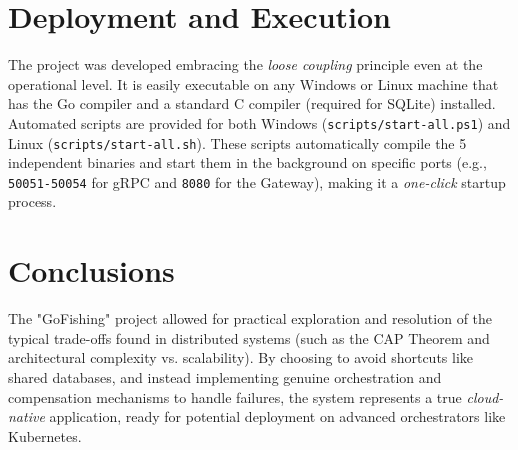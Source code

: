 \documentclass[12pt,a4paper]{article}
\begin{document}
\section{Deployment and Execution}
The project was developed embracing the \textit{loose coupling} principle even at the operational level. It is easily executable on any Windows or Linux machine that has the Go compiler and a standard C compiler (required for SQLite) installed.
Automated scripts are provided for both Windows (\texttt{scripts/start-all.ps1}) and Linux (\texttt{scripts/start-all.sh}).
These scripts automatically compile the 5 independent binaries and start them in the background on specific ports (e.g., \texttt{50051-50054} for gRPC and \texttt{8080} for the Gateway), making it a \textit{one-click} startup process.

\section{Conclusions}
The "GoFishing" project allowed for practical exploration and resolution of the typical trade-offs found in distributed systems (such as the CAP Theorem and architectural complexity vs. scalability).
By choosing to avoid shortcuts like shared databases, and instead implementing genuine orchestration and compensation mechanisms to handle failures, the system represents a true \textit{cloud-native} application, ready for potential deployment on advanced orchestrators like Kubernetes.
\end{document}
